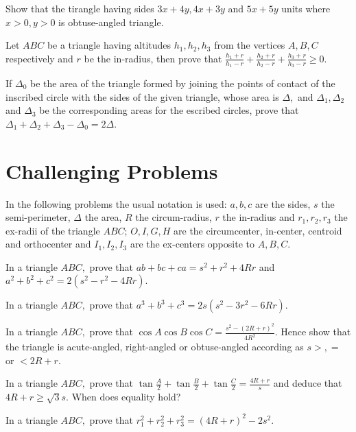\item Show that the tirangle having sides $3x + 4y, 4x + 3y$ and $5x + 5y$ units where $x > 0, y > 0$ is
   obtuse-angled triangle.

\item Let $ABC$ be a triangle having altitudes $h_1, h_2, h_3$ from the vertices $A, B, C$ respectively and
   $r$ be the in-radius, then prove that $\frac{h_1 + r}{h_1 - r} + \frac{h_2 + r}{h_2 - r} + \frac{h_3 + r}{h_3 -
   r}\geq 0.$

\item If $\Delta_0$ be the area of the triangle formed by joining the points of contact of the inscribed circle with the sides
   of the given triangle, whose area is $\Delta,$ and $\Delta_1, \Delta_2$ and $\Delta_3$ be the corresponding
   areas for the escribed circles, prove that $\Delta_1 + \Delta_2 + \Delta_3 - \Delta_0 = 2\Delta.$
 \stopitemize

\section{Challenging Problems}
In the following problems the usual notation is used: $a, b, c$ are the sides, $s$ the semi-perimeter, $\Delta$ the area,
$R$ the circum-radius, $r$ the in-radius and $r_1, r_2, r_3$ the ex-radii of the triangle $ABC$; $O, I, G, H$ are the
circumcenter, in-center, centroid and orthocenter and $I_1, I_2, I_3$ are the ex-centers opposite to $A, B, C$.
\startitemize[n, 1*broad]
\item In a triangle $ABC,$ prove that $ab + bc + ca = s^2 + r^2 + 4Rr$ and $a^2 + b^2 + c^2 = 2(s^2 - r^2 - 4Rr).$

\item In a triangle $ABC,$ prove that $a^3 + b^3 + c^3 = 2s(s^2 - 3r^2 - 6Rr).$

\item In a triangle $ABC,$ prove that $\cos A\cos B\cos C = \frac{s^2 - (2R + r)^2}{4R^2}.$ Hence show that the triangle is
   acute-angled, right-angled or obtuse-angled according as $s >, =$ or $< 2R + r.$

\item In a triangle $ABC,$ prove that $\tan\frac{A}{2} + \tan\frac{B}{2} + \tan\frac{C}{2} = \frac{4R + r}{s}$ and deduce
   that $4R + r\geq \sqrt{3}s.$ When does equality hold?

\item In a triangle $ABC,$ prove that $r_1^2 + r_2^2 + r_3^2 = (4R + r)^2 - 2s^2.$

